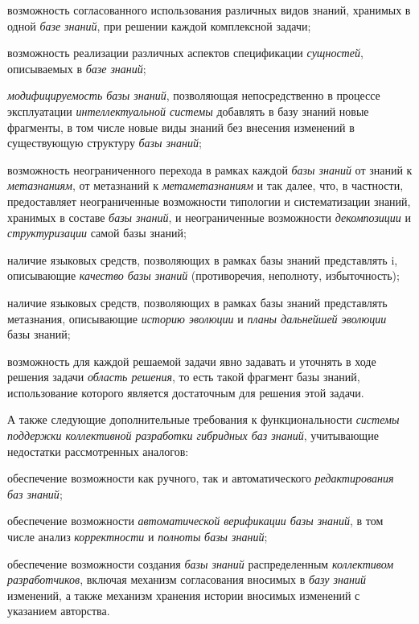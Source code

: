 \begin{textitemize}
\item возможность согласованного использования различных видов знаний, хранимых в одной \textit{базе знаний}, при решении каждой комплексной задачи;

\item возможность реализации различных аспектов спецификации \textit{сущностей}, описываемых в \textit{базе знаний};

\item \textit{модифицируемость базы знаний}, позволяющая непосредственно в процессе эксплуатации \textit{интеллектуальной системы} добавлять в базу знаний новые фрагменты, в том числе новые виды знаний без внесения изменений в существующую структуру \textit{базы знаний};

\item возможность неограниченного перехода в рамках каждой \textit{базы знаний} от знаний к \textit{метазнаниям}, от метазнаний к \textit{метаметазнаниям} и так далее, что, в частности, предоставляет неограниченные возможности типологии и систематизации знаний, хранимых в составе \textit{базы знаний}, и неограниченные возможности \textit{декомпозиции} и \textit{структуризации} самой базы знаний;

\item наличие языковых средств, позволяющих в рамках базы знаний представлять i, описывающие \textit{качество базы знаний} (противоречия, неполноту, избыточность);

\item наличие языковых средств, позволяющих в рамках базы знаний представлять метазнания, описывающие \textit{историю эволюции} и \textit{планы дальнейшей эволюции} базы знаний;

\item возможность для каждой решаемой задачи явно задавать и уточнять в ходе решения задачи \textit{область решения}, то есть такой фрагмент базы знаний, использование которого является достаточным для решения этой задачи.
\end{textitemize}

А также следующие дополнительные требования к функциональности \textit{системы поддержки коллективной разработки гибридных баз знаний}, учитывающие недостатки рассмотренных аналогов:

\begin{textitemize}
\item обеспечение возможности как ручного, так и автоматического \textit{редактирования баз знаний};

\item обеспечение возможности \textit{автоматической верификации базы знаний}, в том числе анализ \textit{корректности} и \textit{полноты} \textit{базы знаний};

\item обеспечение возможности создания \textit{базы знаний} распределенным \textit{коллективом разработчиков}, включая механизм согласования вносимых в \textit{базу знаний} изменений, а также механизм хранения истории вносимых изменений с указанием авторства.
\end{textitemize}

